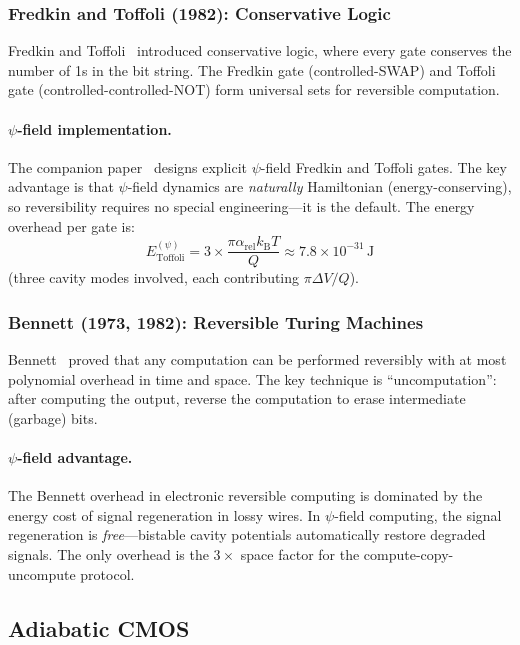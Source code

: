 \documentclass[11pt,twocolumn]{article}
\theoremstyle{definition}
\theoremstyle{remark}
\newcommand{\kB}{k_{\mathrm{B}}}
\begin{document}
\subsubsection{Fredkin and Toffoli (1982): Conservative Logic}

Fredkin and Toffoli~\cite{FredkinToffoli1982} introduced conservative
logic, where every gate conserves the number of 1s in the bit string.
The Fredkin gate (controlled-SWAP) and Toffoli gate
(controlled-controlled-NOT) form universal sets for reversible computation.

\paragraph{$\psi$-field implementation.} The companion
paper~\cite{Alcock2025psiComputing} designs explicit $\psi$-field
Fredkin and Toffoli gates. The key advantage is that $\psi$-field
dynamics are \emph{naturally} Hamiltonian (energy-conserving), so
reversibility requires no special engineering---it is the default. The
energy overhead per gate is:
\begin{equation}
E_{\text{Toffoli}}^{(\psi)} = 3 \times \frac{\pi\alpha_{\mathrm{rel}}\kB T}{Q}
\approx 7.8\times 10^{-31}\,\mathrm{J}
\end{equation}
(three cavity modes involved, each contributing $\pi\Delta V/Q$).

\subsubsection{Bennett (1973, 1982): Reversible Turing Machines}

Bennett~\cite{Bennett1973} proved that any computation can be performed
reversibly with at most polynomial overhead in time and space. The key
technique is ``uncomputation'': after computing the output, reverse the
computation to erase intermediate (garbage) bits.

\paragraph{$\psi$-field advantage.} The Bennett overhead in electronic
reversible computing is dominated by the energy cost of signal
regeneration in lossy wires. In $\psi$-field computing, the signal
regeneration is \emph{free}---bistable cavity potentials automatically
restore degraded signals. The only overhead is the $3\times$ space
factor for the compute-copy-uncompute protocol.

\subsection{Adiabatic CMOS}
\end{document}
